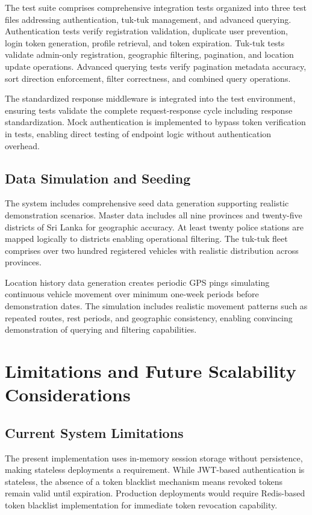 \documentclass[12pt,a4paper]{article}
\begin{document}
The test suite comprises comprehensive integration tests organized into three test files addressing authentication, tuk-tuk management, and advanced querying. Authentication tests verify registration validation, duplicate user prevention, login token generation, profile retrieval, and token expiration. Tuk-tuk tests validate admin-only registration, geographic filtering, pagination, and location update operations. Advanced querying tests verify pagination metadata accuracy, sort direction enforcement, filter correctness, and combined query operations.

The standardized response middleware is integrated into the test environment, ensuring tests validate the complete request-response cycle including response standardization. Mock authentication is implemented to bypass token verification in tests, enabling direct testing of endpoint logic without authentication overhead.

\subsection{Data Simulation and Seeding}

The system includes comprehensive seed data generation supporting realistic demonstration scenarios. Master data includes all nine provinces and twenty-five districts of Sri Lanka for geographic accuracy. At least twenty police stations are mapped logically to districts enabling operational filtering. The tuk-tuk fleet comprises over two hundred registered vehicles with realistic distribution across provinces.

Location history data generation creates periodic GPS pings simulating continuous vehicle movement over minimum one-week periods before demonstration dates. The simulation includes realistic movement patterns such as repeated routes, rest periods, and geographic consistency, enabling convincing demonstration of querying and filtering capabilities.

\section{Limitations and Future Scalability Considerations}

\subsection{Current System Limitations}

The present implementation uses in-memory session storage without persistence, making stateless deployments a requirement. While JWT-based authentication is stateless, the absence of a token blacklist mechanism means revoked tokens remain valid until expiration. Production deployments would require Redis-based token blacklist implementation for immediate token revocation capability.
\end{document}
